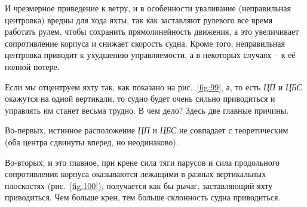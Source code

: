 \documentclass[a4paper, 12pt, twoside, final]{scrbook}
\begin{document}
И чрезмерное приведение к ветру, и в особенности уваливание (неправильная центровка) вредны для хода яхты, так как заставляют рулевого все время работать рулем, чтобы сохранить прямолинейность движения, а это увеличивает сопротивление корпуса и снижает скорость судна. Кроме того, неправильная центровка приводит к ухудшению управляемости, а в некоторых случаях \--- к её полной потере.

Если мы отцентруем яхту так, как показано на рис.~\ref{fig:99}, а, то есть \textit{ЦП} и \textit{ЦБС} окажутся на одной вертикали, то судно будет очень сильно приводиться и управлять им станет весьма трудно. В чем дело? Здесь две главные причины. 

Во-первых, истинное расположение \textit{ЦП} и \textit{ЦБС} не совпадает с теоретическим (оба центра сдвинуты вперед, но неодинаково).

Во-вторых, и это главное, при крене сила тяги парусов и сила продольного сопротивления корпуса оказываются лежащими в разных вертикальных плоскостях (рис.~\ref{fig:100}), получается как бы рычаг, заставляющий яхту приводиться. Чем больше крен, тем больше склонность судна приводиться.
\end{document}
